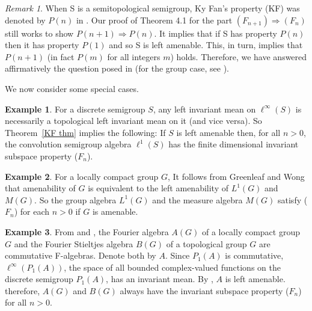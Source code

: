 \documentclass{tran-l}
\numberwithin{equation}{section}
\theoremstyle{definition}
\newtheorem{exa}{Example}
\theoremstyle{remark}
\newtheorem{remark}[thm]{Remark}
\begin{document}
\begin{remark}
When S is a semitopological semigroup, Ky Fan's property (KF) was denoted by $P(n)$ in \cite{Lau_invar}. Our proof of Theorem 4.1 for the part $(F_{n+1})\Rightarrow (F_n)$ still works to show $P(n+1)\Rightarrow P(n)$. It implies that if S has property $P(n)$ then it has property $P(1)$ and so S is left amenable. This, in turn, implies that $P(n+1)$ (in fact $P(m)$ for all integers $m$) holds. Therefore, we have answered affirmatively the question posed in \cite[Page 376]{Lau_invar} (for the group case, see \cite[Theorem 4.2]{L-P-W}).
\end{remark}

We now consider some special cases.

\begin{exa}
For a discrete semigroup $S$, any left invariant mean on $\ell^\infty(S)$ is necessarily a topological left invariant mean on it (and vice versa). So Theorem~\ref{KF thm} implies the following:
If $S$ is left amenable then, for all $n>0$, the convolution semigroup algebra $\ell^1(S)$ has the finite dimensional invariant subspace property ($F_n$). 
\end{exa}

\begin{exa}\label{group}
For a locally compact group $G$, It follows from Greenleaf \cite[Theorem~2.2.1]{Greenleaf} and Wong \cite[Theorem 3.3]{Wong 71} that amenability of $G$ is equivalent to the left amenability of $L^1(G)$ and $M(G)$. So the group algebra $L^1(G)$ and the measure algebra $M(G)$ satisfy ($F_n$) for each $n>0$ if $G$ is amenable. 
\end{exa}

\begin{exa}\label{Fourier}
From \cite{Eymard} and \cite{Lau-Ludwig}, the Fourier algebra $A(G)$ of a locally compact group $G$ and the Fourier Stieltjes algebra $B(G)$ of a topological group $G$ are commutative F-algebras. Denote both by $A$. Since $P_1(A)$ is commutative, $\ell^\infty(P_1(A))$, the space of all bounded complex-valued functions on the discrete semigroup $P_1(A)$, has an invariant mean. By \cite[Lemma~2.1]{L-W 88}, $A$ is left amenable. therefore, $A(G)$ and $B(G)$ always have the invariant subspace property ($F_n$) for all $n>0$.
\end{exa}
\end{document}
